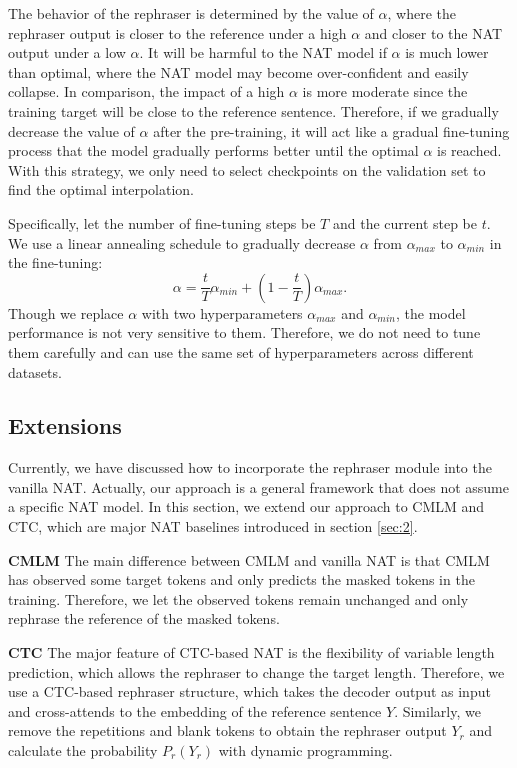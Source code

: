 \documentclass[letterpaper]{article} %
\begin{document}
The behavior of the rephraser is determined by the value of $\alpha$, where the rephraser output is closer to the reference under a high $\alpha$ and closer to the NAT output under a low $\alpha$. It will be harmful to the NAT model if $\alpha$ is much lower than optimal, where the NAT model may become over-confident and easily collapse. In comparison, the impact of a high $\alpha$ is more moderate since the training target will be close to the reference sentence. Therefore, if we gradually decrease the value of $\alpha$ after the pre-training, it will act like a gradual fine-tuning process that the model gradually performs better until the optimal $\alpha$ is reached. With this strategy, we only need to select checkpoints on the validation set to find the optimal interpolation.

Specifically, let the number of fine-tuning steps be $T$ and the current step be $t$. We use a linear annealing schedule to gradually decrease $\alpha$ from $\alpha_{max}$ to $\alpha_{min}$ in the fine-tuning:
\begin{equation}
\label{eq:alpha}
\alpha = \frac{t}{T}\alpha_{min}+(1-\frac{t}{T})\alpha_{max}.
\end{equation}
Though we replace $\alpha$ with two hyperparameters $\alpha_{max}$ and $\alpha_{min}$, the model performance is not very sensitive to them. Therefore, we do not need to tune them carefully and can use the same set of hyperparameters across different datasets.
\subsection{Extensions}
\label{sec:33}
Currently, we have discussed how to incorporate the rephraser module into the vanilla NAT. Actually, our approach is a general framework that does not assume a specific NAT model. In this section, we extend our approach to CMLM and CTC, which are major NAT baselines introduced in section \ref{sec:2}.

\vspace{5pt}
\noindent{}\textbf{CMLM} The main difference between CMLM and vanilla NAT is that CMLM has observed some target tokens and only predicts the masked tokens in the training. Therefore, we let the observed tokens remain unchanged and only rephrase the reference of the masked tokens.

\vspace{5pt}
\noindent{}\textbf{CTC} The major feature of CTC-based NAT is the flexibility of variable length prediction, which allows the rephraser to change the target length. Therefore, we use a CTC-based rephraser structure, which takes the decoder output as input and cross-attends to the embedding of the reference sentence $Y$. Similarly, we remove the repetitions and blank tokens to obtain the rephraser output $Y_r$ and calculate the probability $P_r(Y_r)$ with dynamic programming.
\end{document}
